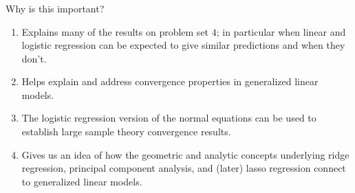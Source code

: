\begin{frame}[fragile] \frametitle{}

Why is this important? \pause
\begin{enumerate}
\item Explains many of the results on problem set $4$; in
particular when linear and logistic regression can be expected
to give similar predictions and when they don't. \pause
\item Helps explain and address convergence properties in
generalized linear models. \pause
\item The logistic regression version of the normal equations
can be used to establish large sample theory convergence results. \pause
\item Gives us an idea of how the geometric and analytic concepts underlying
ridge regression, principal component analysis, and (later) lasso regression
connect to generalized linear models.
\end{enumerate}

\end{frame}













